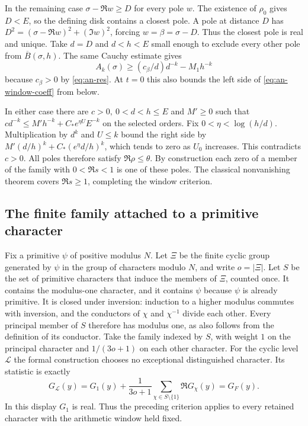 In the remaining case \(\sigma-\Re w\geq D\) for every pole \(w\).
The existence of \(\rho_0\) gives \(D<E\), so the defining disk
contains a closest pole. A pole at distance \(D\) has
\(D^2=(\sigma-\Re w)^2+(\Im w)^2\), forcing
\(w=\beta=\sigma-D\). Thus the closest pole is real and unique.
Take \(d=D\) and \(d<h<E\) small enough to exclude every other pole
from \(\overline B(\sigma,h)\). The same Cauchy estimate gives
\[
 A_k(\sigma)\geq(c_\beta/d)d^{-k}-M_1h^{-k}
\]
because \(c_\beta>0\) by \eqref{eq:an-res}. At \(t=0\) this also
bounds the left side of \eqref{eq:an-window-coeff} from below.

In either case there are \(c>0,\ 0<d<h\leq E\) and \(M'\geq0\)
such that \(c d^{-k}\leq M'h^{-k}+C_* e^{\eta U}E^{-k}\) on the
selected orders. Fix \(0<\eta<\log(h/d)\). Multiplication by \(d^k\)
and \(U\leq k\) bound the right side by
\(M'(d/h)^k+C_*(e^\eta d/h)^k\), which tends to zero as \(U_0\)
increases. This contradicts \(c>0\). All poles therefore satisfy
\(\Re\rho\leq\theta\). By construction each zero of a member of the
family with \(0<\Re s<1\) is one of these poles. The classical
nonvanishing theorem covers \(\Re s\geq1\), completing the window
criterion.

\subsection{The finite family attached to a primitive character}

Fix a primitive \(\psi\) of positive modulus \(N\). Let \(\Xi\) be the
finite cyclic group generated by \(\psi\) in the group of characters
modulo \(N\), and write \(o=|\Xi|\). Let \(S\) be the set of primitive
characters that induce the members of \(\Xi\), counted once.
It contains the modulus-one character, and it contains \(\psi\) because
\(\psi\) is already primitive. It is closed under inversion: induction
to a higher modulus commutes with inversion, and the conductors of
\(\chi\) and \(\chi^{-1}\) divide each other. Every principal member
of \(S\) therefore has modulus one, as also follows from the definition
of its conductor. Take the family indexed by \(S\), with weight \(1\)
on the principal character and \(1/(3o+1)\) on each other character.
For the cyclic level \(\mathcal L\) the formal construction chooses
no exceptional distinguished character. Its statistic is exactly
\[
 G_{\mathcal L}(y)=G_1(y)+\frac{1}{3o+1}
                  \sum_{\chi\in S\setminus\{1\}}\Re G_\chi(y)
                 =G_F(y).
\]
In this display \(G_1\) is real. Thus the preceding criterion applies
to every retained character with the arithmetic window held fixed.


